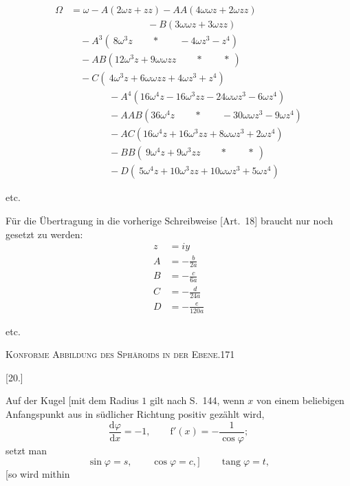 \[
\begin{aligned}
\Omega&=\omega-A(2\omega z+zz)-AA(4\omega\omega z+2\omega zz)\\
&\qquad\qquad\qquad\qquad-B(3\omega\omega z+3\omega zz)\\[5pt]
&\quad-A^3(\ 8\omega^3z\qquad\ast\qquad-4\omega z^3-z^4)\\
&\quad-AB(12\omega^3z+9\omega\omega zz\qquad\ast\qquad\ast\ )\\
&\quad-C(\ 4\omega^3z+6\omega\omega zz+4\omega z^3+z^4)\\[5pt]
&\qquad\qquad-A^4(16\omega^4z-16\omega^3zz-24\omega\omega z^3-6\omega z^4)\\
&\qquad\qquad-AAB(36\omega^4z\qquad\ast\qquad-30\omega\omega z^3-9\omega z^4)\\
&\qquad\qquad-AC(16\omega^4z+16\omega^3zz+8\omega\omega z^3+2\omega z^4)\\
&\qquad\qquad-BB(\ 9\omega^4z+9\omega^3zz\qquad\ast\qquad\ast\ )\\
&\qquad\qquad-D(\ 5\omega^4z+10\omega^3zz+10\omega\omega z^3+5\omega z^4)
\end{aligned}
\]
\begin{center}etc.\end{center}
\par\endgroup
Für die Übertragung in die vorherige Schreibweise [Art.~18] braucht nur noch gesetzt zu werden:
\[
\begin{aligned}
z&=iy\\[5pt]
A&=-\frac b{2a}\\[5pt]
B&=-\frac c{6a}\\[5pt]
C&=-\frac d{24a}\\[5pt]
D&=-\frac e{120a}
\end{aligned}
\]
\begin{center}etc.\end{center}
\clearpage
\noindent\mbox{}\hfill\textsc{Konforme Abbildung des Sphäroids in der Ebene.}\hfill171\par\medskip
\begin{center}[20.]\end{center}
Auf der Kugel [mit dem Radius $1$ gilt nach S.~144, wenn $x$ von einem beliebigen Anfangspunkt aus in südlicher Richtung positiv gezählt wird,
\[
\frac{\mathrm d\varphi}{\mathrm dx}=-1,\qquad\mathrm f'(x)=-\frac1{\cos\varphi};
\]
setzt man
\[
\sin\varphi=s,\qquad\cos\varphi=c,]\qquad\operatorname{tang}\varphi=t,
\]
[so wird mithin
\begingroup\small
